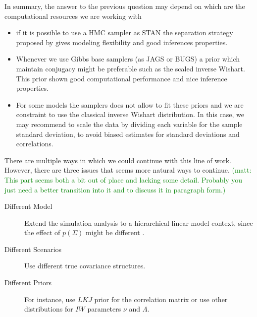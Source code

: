 \documentclass[a4paper]{article}
\newcommand{\matt}[1]{\textcolor{green}{(matt: #1)}}
\begin{document}
In summary, the answer to the previous question may depend on which are the computational resources we are working with 
\begin{itemize}
\item  if it is possible to use a HMC sampler as STAN the separation strategy proposed by \cite{barnard2000} gives modeling flexibility and good inferences properties. 
\item Whenever we use Gibbs base samplers (as JAGS or BUGS) a prior which maintain conjugacy might be preferable such as the scaled inverse Wishart. This prior shown good computational performance and nice inference properties.  
\item For some models the samplers does not allow to fit these priors and we are constraint to use the classical inverse Wishart distribution. In this case, we may recommend to scale the data by dividing each variable for the sample standard deviation, to avoid biased estimates for standard deviations and correlations. 
\end{itemize}

There are multiple ways in which we could continue with this line of work. However, there are three issues that seems more natural ways to continue. 
\matt{This part seems both a bit out of place and lacking some detail. Probably you just need a better transition into it and to discuss it in paragraph form.}
\begin{description}
\item[Different Model] Extend the simulation analysis to a hierarchical linear model context, since the effect of $p(\Sigma)$ might be different \citep{gelman2006prior}. 
\item[Different Scenarios]  Use different true covariance structures. 
\item[Different Priors] For instance, use $LKJ$ prior for the correlation matrix or use other distributions for $IW$ parameters $\nu$ and $\Lambda$.
\end{description}


      
      
\end{document}
